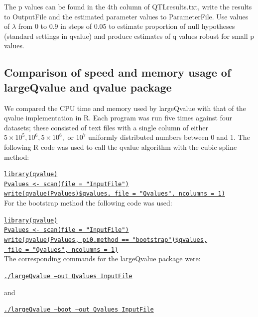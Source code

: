 \documentclass{amsart}
\begin{document}
The p values can be found in the 4th column of QTLresults.txt, write the results to OutputFile and the estimated parameter values to ParameterFile. Use values of $\lambda$ from 0 to 0.9 in steps of 0.05 to estimate proportion of null hypotheses (standard settings in qvalue) and produce estimates of q values robust for small p values.

\subsection{Comparison of speed and memory usage of largeQvalue and qvalue package}
\label{sec:compare}

We compared the CPU time and memory used by largeQvalue with that of the qvalue implementation in R. Each program was run five times against four datasets; these consisted of text files with a single column of either $5\times10^5, 10^6, 5\times10^6,$ or $10^7$ uniformly distributed numbers between 0 and 1. The following R code was used to call the qvalue algorithm with the cubic spline method:

\noindent\texttt{\underline{library(qvalue)}}\\
\texttt{\underline{Pvalues <- scan(file = "InputFile")}}\\
\texttt{\underline{write(qvalue(Pvalues)\$qvalues, file = "Qvalues", ncolumns = 1)}}\\

\noindent For the bootstrap method the following code was used:

\noindent \underline{\texttt{library(qvalue)}} \\
\underline{\texttt{Pvalues <- scan(file = "InputFile")}} \\
\underline{\texttt{write(qvalue(Pvalues, pi0.method == "bootstrap")\$qvalues,}} \\
\qquad\underline{\texttt{ file = "Qvalues", ncolumns = 1)}} \\

\noindent The corresponding commands for the largeQvalue package were:

\noindent\underline{\texttt{./largeQvalue --out Qvalues InputFile}}

\noindent and

\noindent\underline{\texttt{./largeQvalue --boot --out Qvalues InputFile}}

\end{document}
